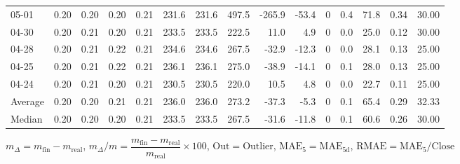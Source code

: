 \begin{threeparttable}
{\begin{tabular}{lrrrrrrrrrrrrrr}
  05-01 &          0.20 &          0.20 &          0.20 &        0.21 &               231.6 &              231.6 &               497.5 &     -265.9 &        -53.4 &              0 &                 0.4 &             71.8 &            0.34 &                  30.00 \\
  04-30 &          0.20 &          0.21 &          0.20 &        0.21 &               233.5 &              233.5 &               222.5 &       11.0 &          4.9 &              0 &                 0.0 &             25.0 &            0.12 &                  30.00 \\
  04-28 &          0.20 &          0.21 &          0.22 &        0.21 &               234.6 &              234.6 &               267.5 &      -32.9 &        -12.3 &              0 &                 0.0 &             28.1 &            0.13 &                  25.00 \\
  04-25 &          0.20 &          0.21 &          0.22 &        0.21 &               236.1 &              236.1 &               275.0 &      -38.9 &        -14.1 &              0 &                 0.1 &             28.0 &            0.13 &                  25.00 \\
  04-24 &          0.20 &          0.21 &          0.20 &        0.21 &               230.5 &              230.5 &               220.0 &       10.5 &          4.8 &              0 &                 0.0 &             22.7 &            0.11 &                  25.00 \\
Average &          0.20 &          0.20 &          0.21 &        0.21 &               236.0 &              236.0 &               273.2 &      -37.3 &         -5.3 &              0 &                 0.1 &             65.4 &            0.29 &                  32.33 \\
 Median &          0.20 &          0.20 &          0.20 &        0.21 &               233.5 &              233.5 &               267.5 &      -31.6 &        -11.8 &              0 &                 0.1 &             60.6 &            0.26 &                  30.00 \\
\bottomrule
\end{tabular}
}
\begin{tablenotes}\footnotesize
\item $m_\Delta=m_{\text{fin}}-m_{\text{real}}$,
$m_\Delta/m=\dfrac{m_{\text{fin}}-m_{\text{real}}}{m_{\text{real}}}\times100$,
$\mathrm{Out}=\text{Outlier}$,
$\mathrm{MAE}_5=\mathrm{MAE}_{5\text{d}}$,
$\mathrm{RMAE}=\mathrm{MAE}_5/\text{Close}$
\end{tablenotes}
\end{threeparttable}
\endgroup

